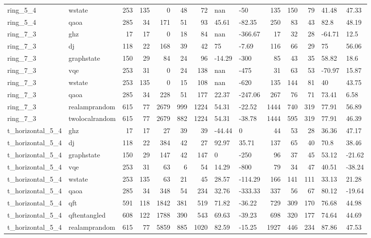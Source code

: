\begin{longtable}{llrrrrrllrrrll}
ring\_5\_4 & wstate & 253 & 135 & 0 & 48 & 72 & nan & -50 & 135 & 150 & 79 & 41.48 & 47.33 \\
ring\_5\_4 & qaoa & 285 & 34 & 171 & 51 & 93 & 45.61 & -82.35 & 250 & 83 & 43 & 82.8 & 48.19 \\
ring\_7\_3 & ghz & 17 & 17 & 0 & 18 & 84 & nan & -366.67 & 17 & 32 & 28 & -64.71 & 12.5 \\
ring\_7\_3 & dj & 118 & 22 & 168 & 39 & 42 & 75 & -7.69 & 116 & 66 & 29 & 75 & 56.06 \\
ring\_7\_3 & graphstate & 150 & 29 & 84 & 24 & 96 & -14.29 & -300 & 85 & 43 & 35 & 58.82 & 18.6 \\
ring\_7\_3 & vqe & 253 & 31 & 0 & 24 & 138 & nan & -475 & 31 & 63 & 53 & -70.97 & 15.87 \\
ring\_7\_3 & wstate & 253 & 135 & 0 & 15 & 108 & nan & -620 & 135 & 144 & 81 & 40 & 43.75 \\
ring\_7\_3 & qaoa & 285 & 34 & 228 & 51 & 177 & 22.37 & -247.06 & 267 & 76 & 71 & 73.41 & 6.58 \\
ring\_7\_3 & realamprandom & 615 & 77 & 2679 & 999 & 1224 & 54.31 & -22.52 & 1444 & 740 & 319 & 77.91 & 56.89 \\
ring\_7\_3 & twolocalrandom & 615 & 77 & 2679 & 882 & 1224 & 54.31 & -38.78 & 1444 & 595 & 319 & 77.91 & 46.39 \\
t\_horizontal\_5\_4 & ghz & 17 & 17 & 27 & 39 & 39 & -44.44 & 0 & 44 & 53 & 28 & 36.36 & 47.17 \\
t\_horizontal\_5\_4 & dj & 118 & 22 & 384 & 42 & 27 & 92.97 & 35.71 & 137 & 65 & 40 & 70.8 & 38.46 \\
t\_horizontal\_5\_4 & graphstate & 150 & 29 & 147 & 42 & 147 & 0 & -250 & 96 & 37 & 45 & 53.12 & -21.62 \\
t\_horizontal\_5\_4 & vqe & 253 & 31 & 63 & 6 & 54 & 14.29 & -800 & 79 & 34 & 47 & 40.51 & -38.24 \\
t\_horizontal\_5\_4 & wstate & 253 & 135 & 63 & 21 & 45 & 28.57 & -114.29 & 166 & 141 & 111 & 33.13 & 21.28 \\
t\_horizontal\_5\_4 & qaoa & 285 & 34 & 348 & 54 & 234 & 32.76 & -333.33 & 337 & 56 & 67 & 80.12 & -19.64 \\
t\_horizontal\_5\_4 & qft & 591 & 118 & 1842 & 381 & 519 & 71.82 & -36.22 & 729 & 309 & 170 & 76.68 & 44.98 \\
t\_horizontal\_5\_4 & qftentangled & 608 & 122 & 1788 & 390 & 543 & 69.63 & -39.23 & 698 & 320 & 177 & 74.64 & 44.69 \\
t\_horizontal\_5\_4 & realamprandom & 615 & 77 & 5859 & 885 & 1020 & 82.59 & -15.25 & 1927 & 446 & 234 & 87.86 & 47.53 \\

\end{longtable}
